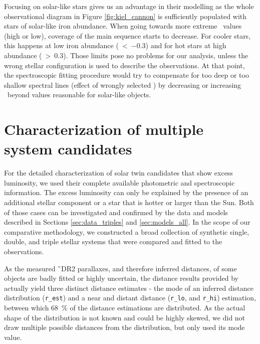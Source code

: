 Focusing on solar-like stars gives us an advantage in their modelling as the whole observational diagram in Figure \ref{fig:kiel_cannon} is sufficiently populated with stars of solar-like iron abundance. When going towards more extreme \Feh\ values (high or low), coverage of the main sequence starts to decrease. For cooler stars, this happens at low iron abundance (\Feh~\textless~$-0.3$) and for hot stars at high abundance (\Feh~\textgreater~$0.3$). Those limits pose no problems for our analysis, unless the wrong stellar configuration is used to describe the observations. At that point, the spectroscopic fitting procedure would try to compensate for too deep or too shallow spectral lines (effect of wrongly selected \Teff) by decreasing or increasing \Feh\ beyond values reasonable for solar-like objects. 

\section{Characterization of multiple system candidates}
\label{sec:multi_fit}
For the detailed characterization of solar twin candidates that show excess luminosity, we used their complete available photometric and spectroscopic information. The excess luminosity can only be explained by the presence of an additional stellar component or a star that is hotter or larger than the Sun. Both of those cases can be investigated and confirmed by the data and models described in Sections \ref{sec:data_triples} and \ref{sec:models_all}. In the scope of our comparative methodology, we constructed a broad collection of synthetic single, double, and triple stellar systems that were compared and fitted to the observations.

As the measured \G\ DR2 parallaxes, and therefore inferred distances, of some objects are badly fitted or highly uncertain, the distance results provided by \citet{2018AJ....156...58B} actually yield three distinct distance estimates - the mode of an inferred distance distribution (\texttt{r\_est}) and a near and distant distance (\texttt{r\_lo}, and \texttt{r\_hi}) estimation, between which 68~\% of the distance estimations are distributed. As the actual shape of the distribution is not known and could be highly skewed, we did not draw multiple possible distances from the distribution, but only used its mode value.

